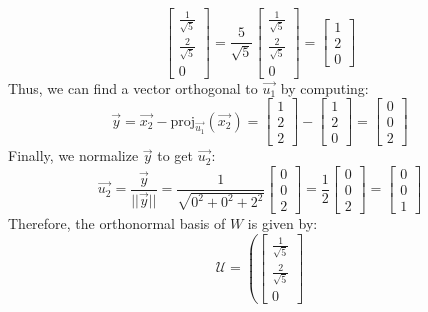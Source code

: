 \begin{eg}
\[\begin{bmatrix}
            \frac{1}{\sqrt{5}} \\ \frac{2}{\sqrt{5}} \\ 0
        \end{bmatrix} = \frac{5}{\sqrt{5}} \begin{bmatrix}
            \frac{1}{\sqrt{5}} \\ \frac{2}{\sqrt{5}} \\ 0
        \end{bmatrix} = \begin{bmatrix}
            1 \\ 2 \\ 0
        \end{bmatrix}
    \]
    Thus, we can find a vector orthogonal to $\vec{u_1}$ by computing:
    \[
        \vec{y} = \vec{x_2} - \text{proj}_{\vec{u_1}}(\vec{x_2}) = \begin{bmatrix}
            1 \\ 2 \\ 2
        \end{bmatrix} - \begin{bmatrix}
            1 \\ 2 \\ 0
        \end{bmatrix} = \begin{bmatrix}
            0 \\ 0 \\ 2
        \end{bmatrix}
    \]
    Finally, we normalize $\vec{y}$ to get $\vec{u_2}$:
    \[
        \vec{u_2} = \frac{\vec{y}}{||\vec{y}||} = \frac{1}{\sqrt{0^2 + 0^2 + 2^2}} \begin{bmatrix}
            0 \\ 0 \\ 2
        \end{bmatrix} = \frac{1}{2} \begin{bmatrix}
            0 \\ 0 \\ 2
        \end{bmatrix} = \begin{bmatrix}
            0 \\ 0 \\ 1
        \end{bmatrix}
    \]
    Therefore, the orthonormal basis of $W$ is given by:
    \[
        \mathcal{U} = \left( \begin{bmatrix}
            \frac{1}{\sqrt{5}} \\ \frac{2}{\sqrt{5}} \\ 0

\end{bmatrix}\]
\end{eg}
